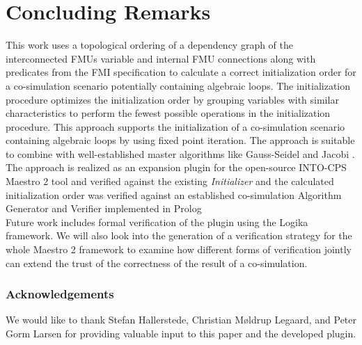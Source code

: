 \section{Concluding Remarks}\label{sc:summary}
This work uses a topological ordering of a dependency graph of the interconnected FMUs variable and internal FMU connections along with predicates from the FMI specification to calculate a correct initialization order for a co-simulation scenario potentially containing algebraic loops.
The initialization procedure optimizes the initialization order by grouping variables with similar characteristics to perform the fewest possible operations in the initialization procedure.
This approach supports the initialization of a co-simulation scenario containing algebraic loops by using fixed point iteration. 
The approach is suitable to combine with well-established master algorithms like Gauss-Seidel and Jacobi \cite{Palensky2017}. 
The approach is realized as an expansion plugin for the open-source INTO-CPS Maestro 2 tool and verified against the existing \textit{Initializer} and the calculated initialization order was verified against an established co-simulation Algorithm Generator and Verifier implemented in Prolog\cite{gomes_lucio_vangheluwe_2019}\\
Future work includes formal verification of the plugin using the Logika framework\cite{inbook}.
We will also look into the generation of a verification strategy for the whole Maestro 2 framework to examine how different forms of verification jointly can extend the trust of the correctness of the result of a co-simulation. 

\subsubsection*{Acknowledgements} We would like to thank Stefan Hallerstede, Christian Møldrup Legaard, and Peter Gorm Larsen for providing valuable input to this paper and the developed plugin.